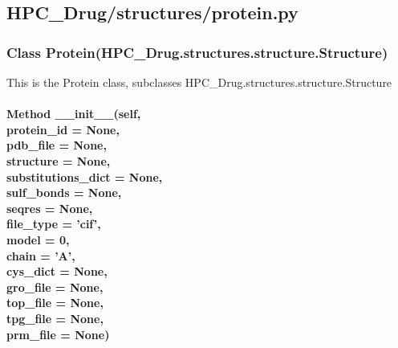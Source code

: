 

\subsection{HPC\_Drug/structures/protein.py}

    \subsubsection{Class Protein(HPC\_Drug.structures.structure.Structure)}

        This is the Protein class, subclasses HPC\_Drug.structures.structure.Structure

        \paragraph{Method \_\_init\_\_(self,\\
        protein\_id = None,\\
        pdb\_file = None,\\
        structure = None,\\
        substitutions\_dict = None,\\
        sulf\_bonds = None,\\
        seqres = None,\\
        file\_type = 'cif',\\
        model = 0,\\
        chain = 'A',\\
        cys\_dict = None,\\
        gro\_file = None,\\
        top\_file = None,\\
        tpg\_file = None,\\
        prm\_file = None)}
    		
